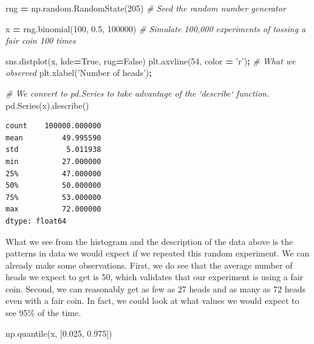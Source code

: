 \documentclass[
  letterpaper,
]{scrbook}
\newenvironment{Shaded}{\begin{snugshade}}{\end{snugshade}}
\newcommand{\CommentTok}[1]{\textcolor[rgb]{0.56,0.35,0.01}{\textit{#1}}}
\newcommand{\DecValTok}[1]{\textcolor[rgb]{0.00,0.00,0.81}{#1}}
\newcommand{\FloatTok}[1]{\textcolor[rgb]{0.00,0.00,0.81}{#1}}
\newcommand{\NormalTok}[1]{#1}
\newcommand{\OperatorTok}[1]{\textcolor[rgb]{0.81,0.36,0.00}{\textbf{#1}}}
\newcommand{\StringTok}[1]{\textcolor[rgb]{0.31,0.60,0.02}{#1}}
\newcommand{\VariableTok}[1]{\textcolor[rgb]{0.00,0.00,0.00}{#1}}
\begin{document}
\begin{Shaded}
\begin{Highlighting}[]
\NormalTok{rng }\OperatorTok{=}\NormalTok{ np.random.RandomState(}\DecValTok{205}\NormalTok{) }\CommentTok{# Seed the random number generator}

\NormalTok{x }\OperatorTok{=}\NormalTok{ rng.binomial(}\DecValTok{100}\NormalTok{, }\FloatTok{0.5}\NormalTok{, }\DecValTok{100000}\NormalTok{) }\CommentTok{# Simulate 100,000 experiments of tossing a fair coin 100 times}

\NormalTok{sns.distplot(x, kde}\OperatorTok{=}\VariableTok{True}\NormalTok{, rug}\OperatorTok{=}\VariableTok{False}\NormalTok{)}
\NormalTok{plt.axvline(}\DecValTok{54}\NormalTok{, color }\OperatorTok{=} \StringTok{'r'}\NormalTok{)}\OperatorTok{;} \CommentTok{# What we observed}
\NormalTok{plt.xlabel(}\StringTok{'Number of heads'}\NormalTok{)}\OperatorTok{;}
\end{Highlighting}
\end{Shaded}

\begin{Shaded}
\begin{Highlighting}[]
\CommentTok{# We convert to pd.Series to take advantage of the `describe` function.}
\NormalTok{pd.Series(x).describe() }
\end{Highlighting}
\end{Shaded}

\begin{verbatim}
count    100000.000000
mean         49.995590
std           5.011938
min          27.000000
25%          47.000000
50%          50.000000
75%          53.000000
max          72.000000
dtype: float64
\end{verbatim}

What we see from the histogram and the description of the data above is the patterns in data we would expect if we repeated this random experiment. We can already make some observations. First, we do see that the average number of heads we expect to get is 50, which validates that our experiment is using a fair coin. Second, we can reasonably get as few as 27 heads and as many as 72 heads even with a fair coin. In fact, we could look at what values we would expect to see 95\% of the time.

\begin{Shaded}
\begin{Highlighting}[]
\NormalTok{np.quantile(x, [}\FloatTok{0.025}\NormalTok{, }\FloatTok{0.975}\NormalTok{])}
\end{Highlighting}
\end{Shaded}
\end{document}
